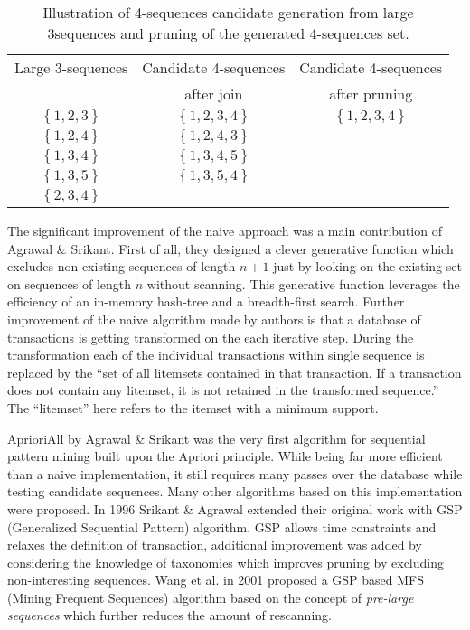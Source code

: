 \begin{table}
\begin{center}
    \begin{tabular}{ | c | c | c |}
    \hline
    Large 3-sequences & Candidate 4-sequences                     & Candidate 4-sequences \\ 
                      & after join                                & after pruning \\ 
    \hline
    $\left\{ 1, 2, 3 \right\} $ & $ \left\{ 1, 2, 3, 4 \right\} $ & $ \left\{ 1, 2, 3, 4 \right\} $ \\ 
    \hline
    $\left\{ 1, 2, 4 \right\} $ & $ \left\{ 1, 2, 4, 3 \right\} $ & \\ 
    \hline
    $\left\{ 1, 3, 4 \right\} $ & $ \left\{ 1, 3, 4, 5 \right\} $ & \\ 
    \hline
    $\left\{ 1, 3, 5 \right\} $ & $ \left\{ 1, 3, 5, 4 \right\} $ & \\ 
    \hline
    $\left\{ 2, 3, 4 \right\} $  &                                & \\ 
    \hline
    \end{tabular}
    \caption{Illustration of 4-sequences candidate generation from large 3sequences and pruning of the generated 4-sequences set.}
    \label{fig:apriori}
    \end{center}
\end{table}

The significant improvement of the naive approach was a main contribution of Agrawal \& Srikant. First of all, they designed a clever generative function which excludes non-existing sequences of length $n+1$ just by looking on the existing set on sequences of length $n$ without scanning. This generative function leverages the efficiency of an in-memory hash-tree and a breadth-first search. Further improvement of the naive algorithm made by authors is that a database of transactions is getting transformed on the each iterative step. During the transformation each of the individual transactions within single sequence is replaced by the ``set of all litemsets contained
in that transaction. If a transaction does not contain any litemset, it is not retained in the transformed sequence.'' The ``litemset'' here refers to the itemset with a minimum support.

AprioriAll by Agrawal \& Srikant was the very first algorithm for sequential pattern mining built upon the Apriori principle. While being far more efficient than a naive implementation, it still requires many passes over the database while testing candidate sequences. Many other algorithms based on this implementation were proposed. In 1996 Srikant \& Agrawal extended their original work with GSP (Generalized Sequential Pattern) algorithm. GSP allows time constraints and relaxes the definition of transaction, additional improvement was added by considering the knowledge of taxonomies which improves pruning by excluding non-interesting sequences. Wang et al. in 2001 proposed a GSP based MFS (Mining Frequent Sequences) \cite{citeulike:5164952} algorithm based on the concept of \textit{pre-large sequences} which further reduces the amount of rescanning.